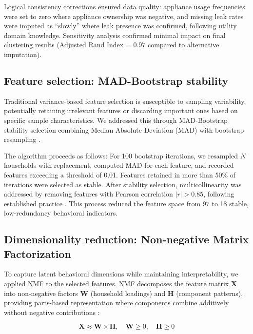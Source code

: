 \documentclass[a4paper,12pt]{article}
\begin{document}
Logical consistency corrections ensured data quality: appliance usage frequencies were set to zero where appliance ownership was negative, and missing leak rates were imputed as ``slowly'' where leak presence was confirmed, following utility domain knowledge. Sensitivity analysis confirmed minimal impact on final clustering results (Adjusted Rand Index = 0.97 compared to alternative imputation).

\subsection{Feature selection: MAD-Bootstrap stability}

Traditional variance-based feature selection is susceptible to sampling variability, potentially retaining irrelevant features or discarding important ones based on specific sample characteristics. We addressed this through MAD-Bootstrap stability selection combining Median Absolute Deviation (MAD) with bootstrap resampling \citep{Meinshausen2010}.

The algorithm proceeds as follows: For 100 bootstrap iterations, we resampled $N$ households with replacement, computed MAD for each feature, and recorded features exceeding a threshold of 0.01. Features retained in more than 50\% of iterations were selected as stable. After stability selection, multicollinearity was addressed by removing features with Pearson correlation $|r|>0.85$, following established practice \citep{Dormann2013}. This process reduced the feature space from 97 to 18 stable, low-redundancy behavioral indicators.

\subsection{Dimensionality reduction: Non-negative Matrix Factorization}

To capture latent behavioral dimensions while maintaining interpretability, we applied NMF to the selected features. NMF decomposes the feature matrix $\mathbf{X}$ into non-negative factors $\mathbf{W}$ (household loadings) and $\mathbf{H}$ (component patterns), providing parts-based representation where components combine additively without negative contributions \citep{Lee1999}:

\begin{equation}
    \mathbf{X} \approx \mathbf{W} \times \mathbf{H}, \quad \mathbf{W} \geq 0, \quad \mathbf{H} \geq 0
\end{equation}
\end{document}
